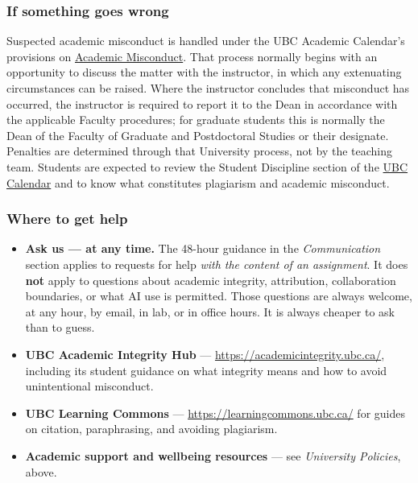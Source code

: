 \documentclass[
]{article}
\providecommand{\tightlist}{%
  \setlength{\itemsep}{0pt}\setlength{\parskip}{0pt}}
\begin{document}
\subsubsection{If something goes wrong}\label{if-something-goes-wrong}

Suspected academic misconduct is handled under the UBC Academic
Calendar's provisions on
\href{https://vancouver.calendar.ubc.ca/campus-wide-policies-and-regulations/student-conduct-and-discipline/discipline-academic-misconduct}{Academic
Misconduct}. That process normally begins with an opportunity to discuss
the matter with the instructor, in which any extenuating circumstances
can be raised. Where the instructor concludes that misconduct has
occurred, the instructor is required to report it to the Dean in
accordance with the applicable Faculty procedures; for graduate students
this is normally the Dean of the Faculty of Graduate and Postdoctoral
Studies or their designate. Penalties are determined through that
University process, not by the teaching team. Students are expected to
review the Student Discipline section of the
\href{https://vancouver.calendar.ubc.ca/campus-wide-policies-and-regulations/student-conduct-and-discipline/discipline-academic-misconduct}{UBC
Calendar} and to know what constitutes plagiarism and academic
misconduct.

\subsubsection{Where to get help}\label{where-to-get-help}

\begin{itemize}
\tightlist
\item
  \textbf{Ask us --- at any time.} The 48-hour guidance in the
  \emph{Communication} section applies to requests for help \emph{with
  the content of an assignment}. It does \textbf{not} apply to questions
  about academic integrity, attribution, collaboration boundaries, or
  what AI use is permitted. Those questions are always welcome, at any
  hour, by email, in lab, or in office hours. It is always cheaper to
  ask than to guess.
\item
  \textbf{UBC Academic Integrity Hub} ---
  \url{https://academicintegrity.ubc.ca/}, including its student
  guidance on what integrity means and how to avoid unintentional
  misconduct.
\item
  \textbf{UBC Learning Commons} ---
  \url{https://learningcommons.ubc.ca/} for guides on citation,
  paraphrasing, and avoiding plagiarism.
\item
  \textbf{Academic support and wellbeing resources} --- see
  \emph{University Policies}, above.
\end{itemize}
\end{document}
